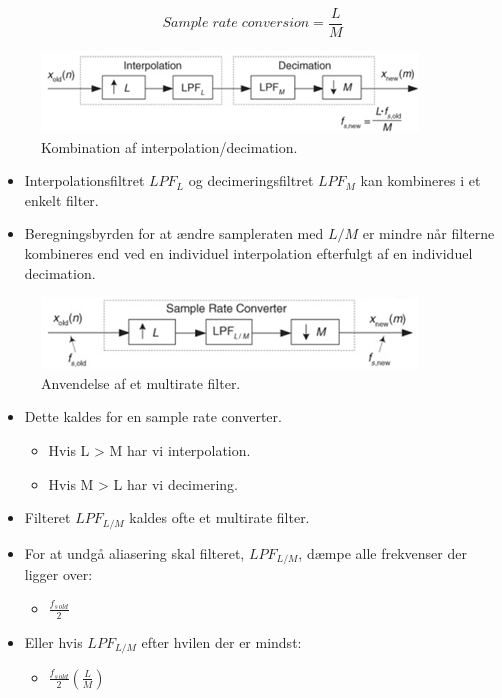 \documentclass[danish]{article}
\begin{document}
\begin{equation}
Sample\;rate\;conversion = \frac{L}{M}
\end{equation}

\begin{figure}[H]
	\centering
	\includegraphics[width=0.4\linewidth]{graphics/multirate1}
	\caption{Kombination af interpolation/decimation.}
	\label{fig:multirate1}
\end{figure}

\begin{itemize}
	\item Interpolationsfiltret $LPF_L$ og decimeringsfiltret $LPF_M$ kan kombineres i et enkelt filter.
	\item Beregningsbyrden for at ændre sampleraten med $L/M$ er mindre når filterne kombineres end ved en individuel interpolation efterfulgt af en individuel decimation. 
\end{itemize}

\begin{figure}[H]
	\centering
	\includegraphics[width=0.4\linewidth]{graphics/multirate2}
	\caption{Anvendelse af et multirate filter.}
	\label{fig:multirate2}
\end{figure}

\begin{itemize}
	\item Dette kaldes for en sample rate converter.
	\begin{itemize}
		\item Hvis L > M har vi interpolation.
		\item Hvis M > L har vi decimering.	
	\end{itemize}
	\item Filteret $LPF_{L/M}$ kaldes ofte et multirate filter.
\end{itemize}

\begin{itemize}
	\item For at undgå aliasering skal filteret, $LPF_{L/M}$, dæmpe alle frekvenser der ligger over:
	\begin{itemize}
		\item $\frac{f_{s\,old}}{2}$
	\end{itemize}
	\item Eller hvis $LPF_{L/M}$ efter hvilen der er mindst:
	\begin{itemize}
		\item $\frac{f_{s\,old}}{2}(\frac{L}{M})$
	\end{itemize}
\end{itemize}
\end{document}
